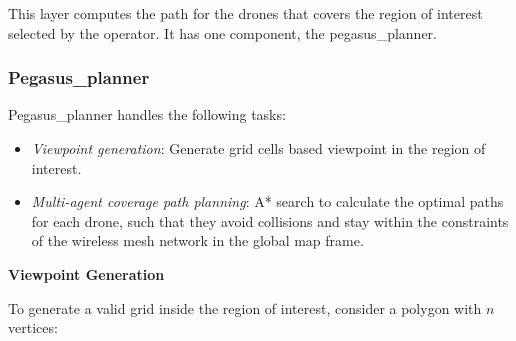 This layer computes the path for the drones that covers the region of interest selected by the operator. It has one component, the pegasus\_planner.

\subsubsection{Pegasus\_planner}

Pegasus\_planner handles the following tasks:
\begin{itemize}
	\item \textit{Viewpoint generation}: Generate grid cells based viewpoint in the region of interest.
	\item \textit{Multi-agent coverage path planning}:  A* search to calculate the optimal paths for each drone, such that they avoid collisions and stay within the constraints of the wireless mesh network in the global map frame.
\end{itemize}

\textbf{Viewpoint Generation}

To generate a valid grid inside the region of interest, consider a polygon with $n$ vertices:

